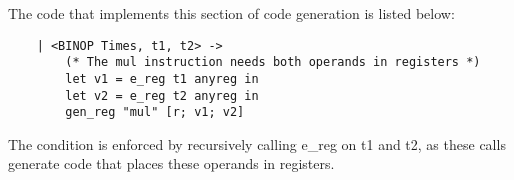 The code that implements this section of code generation is listed below:
\begin{lstlisting}
    | <BINOP Times, t1, t2> ->
        (* The mul instruction needs both operands in registers *)
        let v1 = e_reg t1 anyreg in
        let v2 = e_reg t2 anyreg in
        gen_reg "mul" [r; v1; v2]
\end{lstlisting}
The condition is enforced by recursively calling e\_reg on t1 and t2, as these calls generate code that places these operands in registers.
